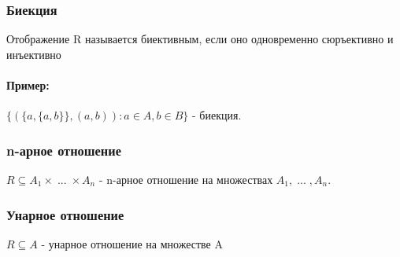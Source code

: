 \subsubsection{Биекция}
Отображение R называется биективным, если оно одновременно сюръективно и инъективно
\paragraph{Пример:}
$\;$ \\ $\{(\{a, \{a, b\}\}, (a, b)) : a \in A, b \in B\}$ - биекция.
\subsubsection{n-арное отношение}
$R \subseteq A_1 \times \; ... \; \times A_n$ - n-арное отношение на множествах $A_1, \; ... \;, A_n$.
\subsubsection{Унарное отношение}
$R \subseteq A$ - унарное отношение на множестве A
